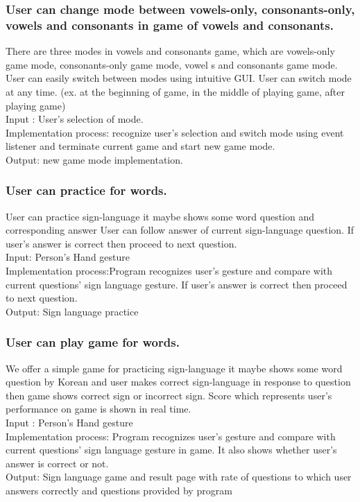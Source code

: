 \documentclass[10pt,journal,compsoc]{IEEEtran}
\begin{document}
\subsubsection{User can change mode between  vowels-only, consonants-only, vowels and consonants in game of vowels and consonants.\\}

There are three modes in vowels and consonants game, which are vowels-only game mode, consonants-only game mode, vowel s and consonants game mode. User can easily switch between modes using intuitive GUI. User can switch mode at any time.
(ex. at the beginning of game, in the middle of playing game, after playing game)
\\Input : User’s selection of mode.
\\Implementation process: recognize user’s selection and switch mode using event listener and terminate current game and start new game mode.
\\Output: new game mode implementation.

\subsubsection{User can practice for words.}

User can practice sign-language it maybe shows some word question and corresponding answer User can follow answer of current sign-language question. If user’s answer is correct then proceed to next question.
\\Input: Person's Hand gesture
\\Implementation process:Program recognizes user’s gesture and compare with current questions’ sign language gesture. If user’s answer is correct then proceed to next question.
\\Output: Sign language practice



\subsubsection{User can play game for words.\\}
We offer a simple game for practicing sign-language it maybe shows some word question by Korean and user makes correct sign-language in response to question then game shows correct sign or incorrect sign.
Score which represents user’s performance on game is shown in real time.
\\Input : Person's Hand gesture
\\Implementation process: Program recognizes user’s gesture and compare with current questions’ sign language gesture in game. It also shows whether user’s answer is correct or not.
\\Output: Sign language game and result page with rate of questions to which user answers correctly and questions provided by program
\end{document}
